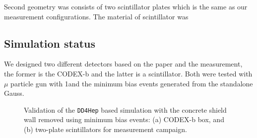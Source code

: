 Second geometry was consists of two scintillator plates which is the same as our measurement configurations.
The material of scintillator was  

\subsection{Simulation status}

We designed two different detectors based on the paper and the measurement, the former is the CODEX-b and the latter is a scintillator.
Both were tested with $\mu$ particle gun with 1\tev and the minimum bias events generated from the standalone Gauss. 

\begin{figure}
\centering
{}
\caption{
    Validation of the {\tt DD4Hep} based simulation with the concrete shield wall removed using minimum bias events: (a) CODEX-b box, and (b) two-plate scintillators for measurement campaign.}
\end{figure}

